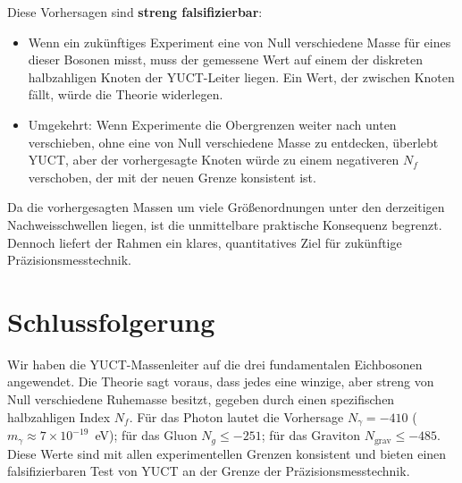 \documentclass[12pt,a4paper]{article}
\begin{document}
	Diese Vorhersagen sind \textbf{streng falsifizierbar}:
	\begin{itemize}
		\item Wenn ein zukünftiges Experiment eine von Null verschiedene Masse für eines dieser Bosonen misst,
		muss der gemessene Wert auf einem der diskreten halbzahligen Knoten der YUCT-Leiter liegen. Ein Wert,
		der zwischen Knoten fällt, würde die Theorie widerlegen.
		\item Umgekehrt: Wenn Experimente die Obergrenzen weiter nach unten verschieben, ohne eine von Null
		verschiedene Masse zu entdecken, überlebt YUCT, aber der vorhergesagte Knoten würde zu einem negativeren
		$N_f$ verschoben, der mit der neuen Grenze konsistent ist.
	\end{itemize}
	
	Da die vorhergesagten Massen um viele Größenordnungen unter den derzeitigen Nachweisschwellen liegen, ist die
	unmittelbare praktische Konsequenz begrenzt. Dennoch liefert der Rahmen ein klares, quantitatives Ziel für
	zukünftige Präzisionsmesstechnik.
	
	\section{Schlussfolgerung}
	
	Wir haben die YUCT-Massenleiter auf die drei fundamentalen Eichbosonen angewendet. Die Theorie sagt voraus,
	dass jedes eine winzige, aber streng von Null verschiedene Ruhemasse besitzt, gegeben durch einen spezifischen
	halbzahligen Index $N_f$. Für das Photon lautet die Vorhersage $N_\gamma = -410$ ($m_\gamma \approx 7\times 10^{-19}$~eV);
	für das Gluon $N_g \le -251$; für das Graviton $N_{\mathrm{grav}} \le -485$. Diese Werte sind mit allen
	experimentellen Grenzen konsistent und bieten einen falsifizierbaren Test von YUCT an der Grenze der Präzisionsmesstechnik.
	
\end{document}
